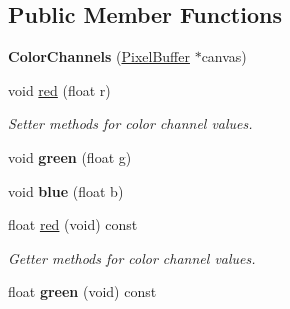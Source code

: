 \subsection*{Public Member Functions}
\begin{DoxyCompactItemize}
\item 
{\bfseries Color\+Channels} (\hyperlink{classimage__tools_1_1PixelBuffer}{Pixel\+Buffer} $\ast$canvas)\hypertarget{classimage__tools_1_1ColorChannels_ae712a551d7bd7ca0845deea6aaea133a}{}\label{classimage__tools_1_1ColorChannels_ae712a551d7bd7ca0845deea6aaea133a}

\item 
void \hyperlink{classimage__tools_1_1ColorChannels_ae800aafa9f8b95da31d2f5711abdd734}{red} (float r)\hypertarget{classimage__tools_1_1ColorChannels_ae800aafa9f8b95da31d2f5711abdd734}{}\label{classimage__tools_1_1ColorChannels_ae800aafa9f8b95da31d2f5711abdd734}

\begin{DoxyCompactList}\small\item\em Setter methods for color channel values. \end{DoxyCompactList}\item 
void {\bfseries green} (float g)\hypertarget{classimage__tools_1_1ColorChannels_ac102f6d571d94dd8e0b29724f3c3610f}{}\label{classimage__tools_1_1ColorChannels_ac102f6d571d94dd8e0b29724f3c3610f}

\item 
void {\bfseries blue} (float b)\hypertarget{classimage__tools_1_1ColorChannels_ad7bc6c29b3d524bdf1fde3885adb90f9}{}\label{classimage__tools_1_1ColorChannels_ad7bc6c29b3d524bdf1fde3885adb90f9}

\item 
float \hyperlink{classimage__tools_1_1ColorChannels_a10a7dd1e5c5527ca5775dbd14eb4815b}{red} (void) const \hypertarget{classimage__tools_1_1ColorChannels_a10a7dd1e5c5527ca5775dbd14eb4815b}{}\label{classimage__tools_1_1ColorChannels_a10a7dd1e5c5527ca5775dbd14eb4815b}

\begin{DoxyCompactList}\small\item\em Getter methods for color channel values. \end{DoxyCompactList}\item 
float {\bfseries green} (void) const \hypertarget{classimage__tools_1_1ColorChannels_ae5457998d8e759d486f46f62f05c9e09}{}\label{classimage__tools_1_1ColorChannels_ae5457998d8e759d486f46f62f05c9e09}


\end{DoxyCompactItemize}
